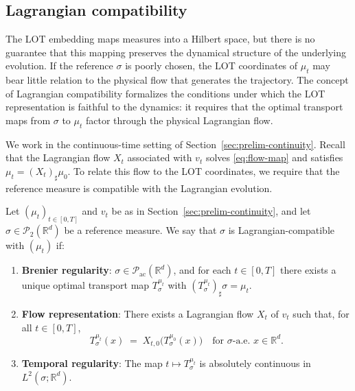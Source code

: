 \documentclass[11pt]{article}
\newcommand{\R}{\mathbb{R}}
\newcommand{\1}{\mathbf{1}}
\begin{document}
\subsection{Lagrangian compatibility}\label{sec:ref-compat}

The LOT embedding maps measures into a Hilbert space, but there is no guarantee that this mapping preserves the dynamical structure of the underlying evolution.  If the reference $\sigma$ is poorly chosen, the LOT coordinates of $\mu_t$ may bear little relation to the physical flow that generates the trajectory.  The concept of Lagrangian compatibility formalizes the conditions under which the LOT representation is faithful to the dynamics: it requires that
the optimal transport maps from $\sigma$ to $\mu_t$ factor through the physical Lagrangian flow.

We work in the continuous-time setting of Section~\ref{sec:prelim-continuity}. Recall that the Lagrangian flow $X_t$ associated with $v_t$ solves \eqref{eq:flow-map} and satisfies $\mu_t = (X_t)_\sharp \mu_0$. To relate this flow to the LOT coordinates, we require that the reference measure is compatible with the Lagrangian evolution. 

\begin{assumption}\label{ass:lag-compat}
Let $(\mu_t)_{t\in[0,T]}$ and $v_t$ be as in Section~\ref{sec:prelim-continuity}, and let $\sigma\in\mathcal{P}_2(\R^d)$ be a reference measure. We say that $\sigma$ is Lagrangian-compatible with $(\mu_t)$ if:

\begin{enumerate}[label=(\roman*)]
\item \textbf{Brenier regularity}: $\sigma\in \mathcal{P}_{\mathrm{ac}}(\R^d)$, and for each $t\in[0,T]$ there exists a unique optimal transport map $T_\sigma^{\mu_t}$ with $(T_\sigma^{\mu_t})_\sharp \sigma = \mu_t$.

\item \textbf{Flow representation}: There exists a Lagrangian flow $X_t$ of $v_t$ such that, for all $t\in[0,T]$,
\begin{equation}\label{eq:flow-representation}
T_\sigma^{\mu_t}(x) \;=\; X_{t,0}\bigl(T_\sigma^{\mu_0}(x)\bigr)
\quad \text{for } \sigma\text{-a.e. } x\in\R^d.
\end{equation}

\item \textbf{Temporal regularity}: The map $t \mapsto T_\sigma^{\mu_t}$ is absolutely continuous in $L^2(\sigma;\R^d)$.
\end{enumerate}
\end{assumption}
\end{document}
